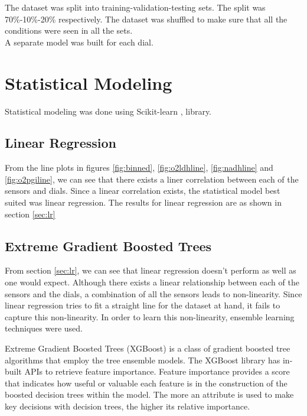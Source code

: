 \documentclass[12pt,chapterheads]{ucsd}
\begin{document}
The dataset was split into training-validation-testing sets. The split was 70\%-10\%-20\% respectively. The dataset was shuffled to make sure that all the conditions were seen in all the sets. \\
A separate model was built for each dial. 

\section{Statistical Modeling}
    Statistical modeling was done using Scikit-learn \cite{scikit-learn}, \cite{sklearn_api} library.
\subsection{Linear Regression}
From the line plots in figures \ref{fig:binned}, \ref{fig:o2ldhline}, \ref{fig:nadhline} and \ref{fig:o2pgiline}, we can see that there exists a liner correlation between each of the sensors and dials. Since a linear correlation exists, the statistical model best suited was linear regression. The results for linear regression are as shown in section \ref{sec:lr}

\subsection{Extreme Gradient Boosted Trees}\label{sec:xgboost}
From section \ref{sec:lr}, we can see that linear regression doesn't perform as well as one would expect. Although there exists a linear relationship between each of the sensors and the dials, a combination of all the sensors leads to non-linearity. Since linear regression tries to fit a straight line for the dataset at hand, it fails to capture this non-linearity. In order to learn this non-linearity, ensemble learning techniques were used.

Extreme Gradient Boosted Trees \string(XGBoost) \cite{Chen:2016:XST:2939672.2939785} is a class of gradient boosted tree algorithms that employ the tree ensemble models.
The XGBoost library has in-built APIs to retrieve feature importance. Feature importance provides a score that indicates how useful or valuable each feature is in the construction of the boosted decision trees within the model. The more an attribute is used to make key decisions with decision trees, the higher its relative importance.
\end{document}
